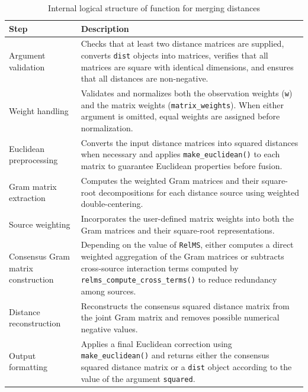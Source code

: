 \begin{table}[h!]
\caption{Internal logical structure of function for merging distances}
\label{tab:merge-logical-structure}
\begin{center}
{\footnotesize
\begin{tabular}{|p{3.5cm}|p{10.2cm}|}
\hline
\textbf{Step} & \textbf{Description} \\
\hline

Argument validation &
Checks that at least two distance matrices are supplied, converts \texttt{dist} objects into matrices, verifies that all matrices are square with identical dimensions, and ensures that all distances are non-negative.
\\
\hline

Weight handling &
Validates and normalizes both the observation weights (\texttt{w}) and the matrix weights (\texttt{matrix\_weights}). When either argument is omitted, equal weights are assigned before normalization.
\\
\hline

Euclidean preprocessing &
Converts the input distance matrices into squared distances when necessary and applies \texttt{make\_euclidean()} to each matrix to guarantee Euclidean properties before fusion.
\\
\hline

Gram matrix extraction &
Computes the weighted Gram matrices and their square-root decompositions for each distance source using weighted double-centering.
\\
\hline

Source weighting &
Incorporates the user-defined matrix weights into both the Gram matrices and their square-root representations.
\\
\hline

Consensus Gram matrix construction &
Depending on the value of \texttt{RelMS}, either computes a direct weighted aggregation of the Gram matrices or subtracts cross-source interaction terms computed by \texttt{relms\_compute\_cross\_terms()} to reduce redundancy among sources.
\\
\hline

Distance reconstruction &
Reconstructs the consensus squared distance matrix from the joint Gram matrix and removes possible numerical negative values.
\\
\hline

Output formatting &
Applies a final Euclidean correction using \texttt{make\_euclidean()} and returns either the consensus squared distance matrix or a \texttt{dist} object according to the value of the argument \texttt{squared}.
\\
\hline

\end{tabular}}
\end{center}
\end{table}

